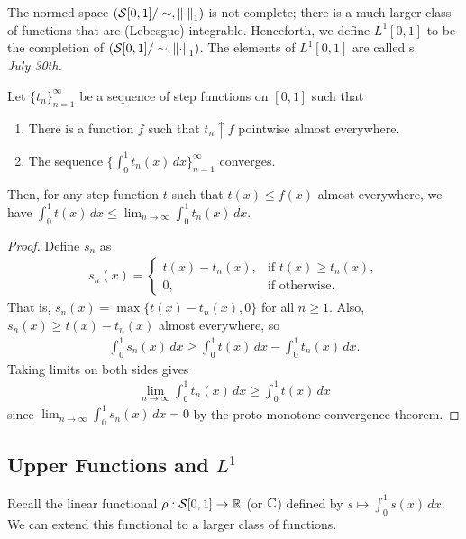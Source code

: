 The normed space $(\mathcal{S}[0,1]/\sim, \left\lVert\cdot\right\rVert_{1})$ is not complete; there is a much larger class of functions that are (Lebesgue) integrable. Henceforth, we define $L^{1}[0,1]$ to be the completion of $(\mathcal{S}[0,1]/\sim, \left\lVert\cdot\right\rVert_{1})$. The elements of $L^{1}[0,1]$ are called s. 
\\

\textit{July 30th.}

\begin{theorem}
    Let $\{t_{n}\}_{n=1}^{\infty}$ be a sequence of step functions on $[0,1]$ such that
    \begin{enumerate}
        \item There is a function $f$ such that $t_{n} \uparrow f$ pointwise almost everywhere.
        \item The sequence $\{\int_{0}^{1} t_{n}(x) \, dx\}_{n=1}^{\infty}$ converges.
    \end{enumerate}
    Then, for any step function $t$ such that $t(x) \leq f(x)$ almost everywhere, we have $\int_{0}^{1} t(x) \, dx \leq \lim_{n \to \infty} \int_{0}^{1} t_{n}(x) \, dx$.
\end{theorem}

\begin{proof}
    Define $s_{n}$ as
    \begin{align}
        s_{n}(x) = \begin{cases}
            t(x)-t_{n}(x), & \text{if } t(x) \geq t_{n}(x), \\
            0, & \text{if otherwise}.
        \end{cases}
    \end{align}
    That is, $s_{n}(x) = \max\{t(x)-t_{n}(x),0\}$ for all $n \geq 1$. Also, $s_{n}(x) \geq t(x) - t_{n}(x)$ almost everywhere, so
    \begin{align}
        \int_{0}^{1} s_{n}(x) \, dx \geq \int_{0}^{1} t(x) \, dx - \int_{0}^{1} t_{n}(x) \, dx.
    \end{align}
    Taking limits on both sides gives
    \begin{align}
        \lim_{n \to \infty} \int_{0}^{1} t_{n}(x) \, dx \geq \int_{0}^{1} t(x) \, dx
    \end{align}
    since $\lim_{n \to \infty} \int_{0}^{1} s_{n}(x) \, dx = 0$ by the proto monotone convergence theorem.
\end{proof}

\subsection{Upper Functions and $L^{1}$}
Recall the linear functional $\rho:\mathcal{S}[0,1] \to \mathbb{R}$ (or $\mathbb{C}$) defined by $s \mapsto \int_{0}^{1} s(x) \, dx$. We can extend this functional to a larger class of functions.

